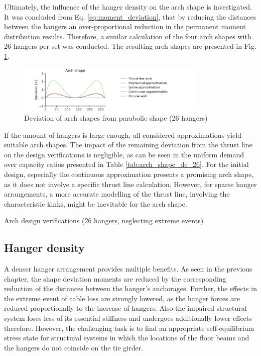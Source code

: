 Ultimately, the influence of the hanger density on the arch shape is investigated. It was concluded from Eq. \eqref{eq:moment_deviation}, that by reducing the distances between the hangers an over-proportional reduction in the permanent moment distribution results. Therefore, a similar calculation of the four arch shapes with 26 hangers per set was conducted. The resulting arch shapes are presented in Fig. \ref{fig:arch_shapes_26}.

\begin{figure}[H]
    \centering
    \includegraphics[trim={0 0 2cm 0},clip, width=0.8\textwidth]{calculations/arch shape/arch_shapes_26.png}
    \caption{Deviation of arch shapes from parabolic shape (26 hangers)}
    \label{fig:arch_shapes_26}
\end{figure}

If the amount of hangers is large enough, all considered approximations yield suitable arch shapes. The impact of the remaining deviation from the thrust line on the design verifications is negligible, as can be seen in the uniform demand over capacity ratios presented in Table \ref{tab:arch_shape_dc_26}. For the initial design, especially the continuous approximation presents a promising arch shape, as it does not involve a specific thrust line calculation. However, for sparse hanger arrangements, a more accurate modelling of the thrust line, involving the characteristic kinks, might be inevitable for the arch shape.

\begin{table}[H]
    \centering
    
    \caption{Arch design verifications (26 hangers, neglecting extreme events)}
    \label{tab:arch_shape_dc_26}
\end{table}


\newpage
\subsection{Hanger density}
A denser hanger arrangement provides multiple benefits. As seen in the previous chapter, the shape deviation moments are reduced by the corresponding reduction of the distances between the hanger's anchorages. Further, the effects in the extreme event of cable loss are strongly lowered, as the hanger forces are reduced proportionally to the increase of hangers. Also the impaired structural system loses less of its essential stiffness and undergoes additionally lower effects therefore. However, the challenging task is to find an appropriate self-equilibrium stress state for structural systems in which the locations of the floor beams and the hangers do not coincide on the tie girder. \medskip

